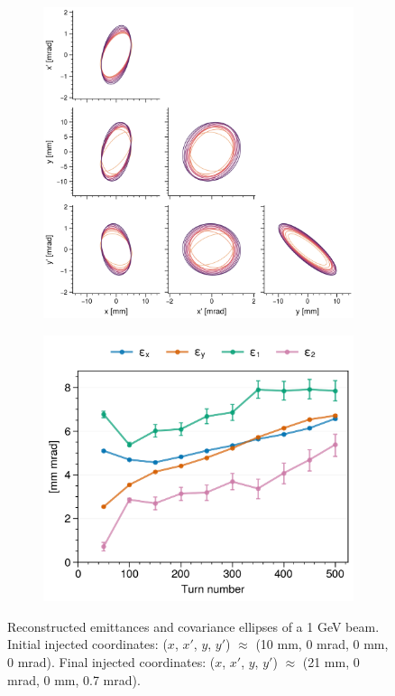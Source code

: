 %
%
\begin{figure}[!p]
    \centering
    \begin{subfigure}{0.6\textwidth}
        \includegraphics[width=\textwidth]{Images/chapter5/exp1b/corner.png}
    \end{subfigure}
    \hfill
    \begin{subfigure}[t]{0.39\textwidth}
        \includegraphics[width=\textwidth]{Images/chapter5/exp1b/emittances.png}
    \end{subfigure}
    \caption{Reconstructed emittances and covariance ellipses of a 1 GeV beam. Initial injected coordinates: ($x$, $x'$, $y$, $y'$) $\approx$ (10 mm, 0 mrad, 0 mm, 0 mrad). Final injected coordinates: ($x$, $x'$, $y$, $y'$) $\approx$ (21 mm, 0 mrad, 0 mm, 0.7 mrad).}
    \label{fig:exp1b_emittances}
\end{figure}
